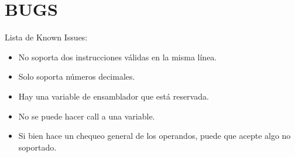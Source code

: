 \documentclass[12pt]{article}
\begin{document}
\section{BUGS}
Lista de Known Issues:
\begin{itemize}
    \item No soporta dos instrucciones v\'alidas en la misma l\'inea.
    \item Solo soporta n\'umeros decimales.
    \item Hay una variable de ensamblador que est\'a reservada.
    \item No se puede hacer call a una variable.
    \item Si bien hace un chequeo general de los operandos, puede que acepte algo
            no soportado.
\end{itemize}
\end{document}
